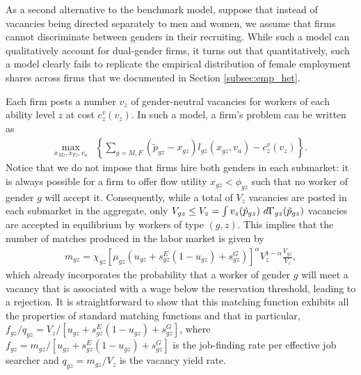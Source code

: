 As a second alternative to the benchmark model, suppose that instead of vacancies being directed separately to men and women, we assume that firms cannot discriminate between genders in their recruiting. While such a model can qualitatively account for dual-gender firms, it turns out that quantitatively, such a model clearly fails to replicate the empirical distribution of female employment shares across firms that we documented in Section \ref{subsec:emp_het}.

Each firm posts a number $v_{z}$ of gender-neutral vacancies for workers of each ability level $z$ at cost $c_{z}^{v}(v_{z})$. In such a model, a firm's problem can be written as
%
\begin{align}
    \max_{x_{Mz},x_{Fz},v_{a}} & \left\{ \sum_{g = M,F} (\tilde{p}_{gz} - x_{gz}) l_{gz}(x_{gz},v_{a}) - c_{z}^{v} (v_{z})  \right\}.
\end{align}
%
Notice that we do not impose that firms hire both genders in each submarket: it is always possible for a firm to offer flow utility $x_{gz} < \phi_{gz}$ such that no worker of gender $g$ will accept it. Consequently, while a total of $V_{z}$ vacancies are posted in each submarket in the aggregate, only $V_{gz} \leq V_{z} = \int v_{z}(\tilde{p}_{gz}) \, \mathop{}\!{d} \Gamma_{gz}(\tilde{p}_{gz})$ vacancies are accepted in equilibrium by workers of type $(g, z)$. This implies that the number of matches produced in the labor market is given by
%
\begin{align}
    m_{gz} = \chi_{gz} [\mu_{gz} (u_{gz} + s_{gz}^{E} (1 - u_{gz}) + s_{gz}^{G} )]^{\alpha} V_{z}^{1-\alpha} \frac{V_{gz}}{V_{z}},
\end{align}
%
which already incorporates the probability that a worker of gender $g$ will meet a vacancy that is associated with a wage below the reservation threshold, leading to a rejection. It is straightforward to show that this matching function exhibits all the properties of standard matching functions and that in particular, $f_{gz}/q_{gz} = V_z/[u_{gz} + s_{gz}^{E} (1 - u_{gz}) + s_{gz}^{G}]$, where $f_{gz} = m_{gz}/[u_{gz} + s_{gz}^{E} (1 - u_{gz}) + s_{gz}^{G}]$ is the job-finding rate per effective job searcher and $q_{gz} = m_{gz}/V_z$ is the vacancy yield rate.

